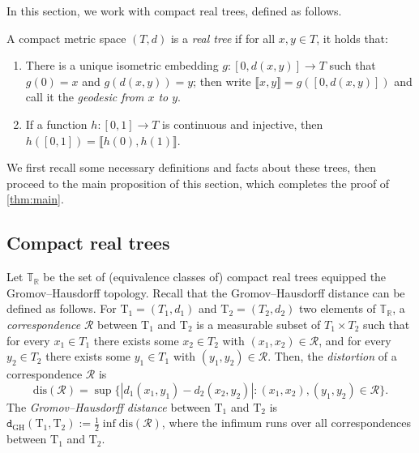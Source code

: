 \documentclass[11pt,reqno]{amsart}
\newcommand{\R}{\mathbb{R}}
\newcommand{\bbT}{\mathbb{T}}
\newcommand{\1}{\mathbf{1}}
\newcommand{\0}{\mathbf{0}}
\newcommand{\rT}{\mathrm{T}}
\newcommand\cR{{\mathcal R}}
\newcommand{\dGH}{\mathtt{d}_{\mathrm{GH}}}
\begin{document}
In this section, we work with compact real trees, defined as follows.
\begin{defn}
\label{real-tree_def}
A compact metric space $(T,d)$ is a \emph{real tree} if for all $x,y\in T$, it holds that:
\begin{enumerate}
    \item[(a)] There is a unique isometric embedding $g:[0,d(x,y)]\to T$ such that $g(0)=x$ and $g(d(x,y))=y$; then write $\llbracket x,y\rrbracket=g([0,d(x,y)])$ and call it the \emph{geodesic from $x$ to $y$}.
    \item[(b)] If a function $h:[0,1]\to T$ is continuous and injective, then $h([0,1])=\llbracket h(0),h(1)\rrbracket$.
\end{enumerate}
\end{defn}

We first recall some necessary definitions and facts about these trees, then proceed to the main proposition of this section, which completes the proof of \cref{thm:main}.


\subsection{Compact real trees}\label{sec:compact_real_tree}
Let $\bbT_\R$ be the set of (equivalence classes of) compact real trees equipped the Gromov--Hausdorff topology. Recall that the Gromov--Hausdorff distance can be defined as follows. For $\rT_1 = (T_1, d_1)$ and $ \rT_2 = (T_2, d_2)$ two elements of $\bbT_\R$, a \emph{correspondence} $\cR$ between $\rT_1$ and $\rT_2$ is a measurable subset of $T_1 \times T_2$ such that for every $x_1 \in T_1$ there exists some $x_2 \in T_2$ with $(x_1, x_2) \in \cR$, and for every $y_2 \in T_2$ there exists some $y_1 \in T_1$ with $(y_1, y_2) \in \cR$. Then, the \emph{distortion} of a correspondence $\cR$ is 
\begin{equation}\label{def-distortion}
    \mathrm{dis}(\cR) = \sup\big\{ |d_1(x_1, y_1) - d_2(x_2, y_2)| : (x_1, x_2), (y_1, y_2) \in \cR \big\}.
\end{equation}
The \emph{Gromov--Hausdorff distance} between $\rT_1$ and $\rT_2$ is $\dGH(\rT_1, \rT_2) := \frac{1}{2}\inf \mathrm{dis}(\cR)$, where the infimum runs over all correspondences between $\rT_1$ and $\rT_2$.
\smallskip 
\end{document}
